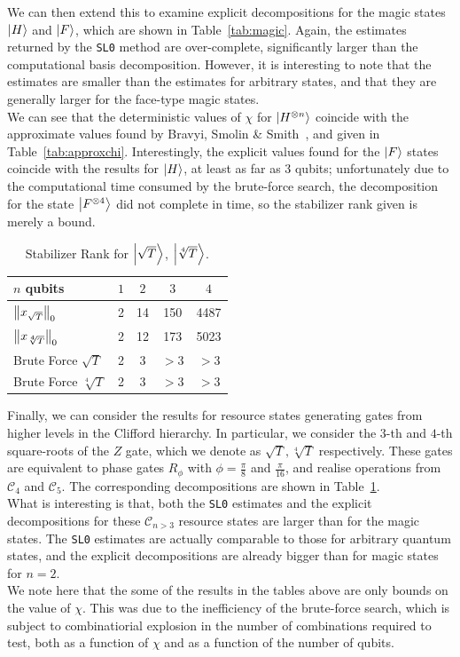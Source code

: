 \documentclass{standalone}
\begin{document}
We can then extend this to examine explicit decompositions for the magic states $\ket{H}$ and $\ket{F}$, which are shown in Table~\ref{tab:magic}. Again, the estimates returned by the \texttt{SL0} method are over-complete, significantly larger than the computational basis decomposition. However, it is interesting to note that the estimates are smaller than the estimates for arbitrary states, and that they are generally larger for the face-type magic states.\\
We can see that the deterministic values of $\chi$ for $\ket{H^{\otimes n}}$ coincide with the approximate values found by Bravyi, Smolin \& Smith~\cite{Bravyi2015}, and given in Table~\ref{tab:approxchi}. Interestingly, the explicit values found for the $\ket{F}$ states coincide with the results for $\ket{H}$, at least as far as $3$ qubits; unfortunately due to the computational time consumed by the brute-force search, the decomposition for the state $\ket{F^{\otimes 4}}$ did not complete in time, so the stabilizer rank given is merely a bound. 
\par

\begin{table}[!h]
\centering
\caption{Stabilizer Rank for $\ket{\sqrt{T}}$, $\ket{\sqrt[4]{T}}$.} \label{tab:highercliff}
\begin{tabular}{||l|c|c|c|c||}
\hline
$n$ qubits & $1$ & $2$ & $3$ & $4$ \\ \hline
$\norm{x_{\sqrt{T}}}_{0}$ & 2 & 14 & 150 & 4487\\ \hline
$\norm{x_{\sqrt[4]{T}}}_{0}$ & 2 & 12 & 173 & 5023\\ \hline
Brute Force $\sqrt{T}$ & 2 & 3  & $>3$ & $>3$\\ \hline
Brute Force $\sqrt[4]{T}$ & 2 & 3  & $>3$ & $>3$\\ \hline
\end{tabular}
\end{table}
Finally, we can consider the results for resource states generating gates from higher levels in the Clifford hierarchy. In particular, we consider the $3$-th and $4$-th square-roots of the $Z$ gate, which we denote as $\sqrt{T}, \sqrt[4]{T}$ respectively. These gates are equivalent to phase gates $R_{\phi}$ with $\phi=\frac{\pi}{8}$ and $\frac{\pi}{16}$, and realise operations from $\mathcal{C}_{4}$ and $\mathcal{C}_{5}$. The corresponding decompositions are shown in Table~\ref{tab:highercliff}. \\
What is interesting is that, both the \texttt{SL0} estimates and the explicit decompositions for these $\mathcal{C}_{n>3}$ resource states are larger than for the magic states. The \texttt{SL0} estimates are actually comparable to those for arbitrary quantum states, and the explicit decompositions are already bigger than for magic states for $n=2$.\\
We note here that the some of the results in the tables above are only bounds on the value of $\chi$. This was due to the inefficiency of the brute-force search, which is subject to combinatiorial explosion in the number of combinations required to test, both as a function of $\chi$ and as a function of the number of qubits. 
\ifstandalone

\fi
\end{document}

